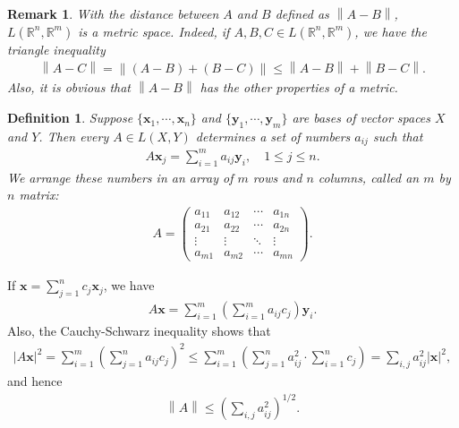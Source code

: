 \documentclass[11pt]{book}
\newtheorem{definition}{Definition}[chapter]
\newtheorem{remark}{Remark}[chapter]
\theoremstyle{definition}
\numberwithin{equation}{chapter}
\begin{document}
\begin{remark}
With the distance between $A$ and $B$ defined as $\left\|A - B\right\|$, $L(\mathbb{R}^n,\mathbb{R}^m)$ is a metric space. Indeed, if $A, B, C \in L(\mathbb{R}^n,\mathbb{R}^m)$, we have the triangle inequality
\begin{align*}
    \left\|A - C\right\| = \left\|(A - B) + (B - C)\right\| \leq \left\|A - B\right\| + \left\|B - C\right\|.
\end{align*}
Also, it is obvious that $\left\|A - B\right\|$ has the other properties of a metric.
\end{remark}

\medskip

\begin{definition}
Suppose $\{\mathbf{x}_1, \cdots, \mathbf{x}_n\}$ and $\{\mathbf{y}_1, \cdots, \mathbf{y}_m\}$ are bases of vector spaces $X$ and $Y$. Then every $A \in L(X,Y)$ determines a set of numbers $a_{ij}$ such that
\begin{align*}
    A\mathbf{x}_j = \sum^m_{i=1} a_{ij} \mathbf{y}_i, \quad 1 \leq j \leq n.
\end{align*}
We arrange these numbers in an array of $m$ rows and $n$ columns, called an $m$ by $n$ matrix:
\begin{align*}
    A = \begin{pmatrix}
        a_{11} & a_{12} & \cdots & a_{1n} \\
        a_{21} & a_{22} & \cdots & a_{2n} \\
        \vdots & \vdots & \ddots & \vdots \\
        a_{m1} & a_{m2} & \cdots & a_{mn}
    \end{pmatrix}.
\end{align*}
\end{definition}

\medskip

If $\mathbf{x} = \sum^n_{j=1} c_j \mathbf{x}_j$, we have
\begin{align*}
    A\mathbf{x} = \sum^m_{i=1} \left(\sum^m_{i=1} a_{ij} c_j\right) \mathbf{y}_i.
\end{align*}
Also, the Cauchy-Schwarz inequality shows that
\begin{align*}
    \left|A\mathbf{x}\right|^2 = \sum^m_{i=1} \left(\sum^n_{j=1} a_{ij} c_j\right)^2 \leq \sum^m_{i=1} \left(\sum^n_{j=1} a_{ij}^2 \cdot \sum^n_{i=1} c_j\right) = \sum_{i,j} a_{ij}^2 \left|\mathbf{x}\right|^2,
\end{align*}
and hence
\begin{align*}
    \left\|A\right\| \leq \left(\sum_{i,j} a_{ij}^2\right)^{1/2}.
\end{align*}
\end{document}
